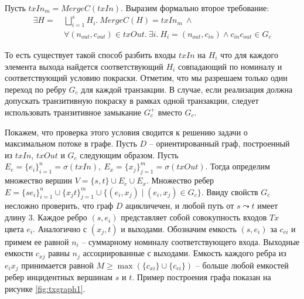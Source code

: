 \documentclass[specification,annotation]{itmo-student-thesis}
\begin{document}
Пусть $txIn_m = MergeC(txIn)$. Выразим формально второе требование:
\begin{align}
  \exists H = \ &\bigsqcup_{i=1}^s{H_i}. \ MergeC(H) = txIn_m \ \wedge \nonumber \\
                &\forall (n_{out},c_{out}) \in txOut . \ \exists i . \ H_i = (n_{out},c_{in}) \wedge c_{in}c_{out} \in G_c \label{eq:1}
\end{align}

То есть существует такой способ разбить входы $txIn$ на $H_i$ что для
каждого элемента выхода найдется соответствующий $H_i$ совпадающий по
номиналу и соответствующий условию покраски. Отметим, что мы разрешаем
только один переход по ребру $G_c$ для каждой транзакции. В случае,
если реализация должна допускать транзитивную покраску в рамках одной
транзакции, следует использовать транзитивное замыкание $G_c^{+}$
вместо $G_c$.

Покажем, что проверка этого условия сводится к решению задачи о
максимальном потоке в графе. Пусть $D$ -- ориентированный граф,
построенный из $txIn$, $txOut$ и $G_c$ следующим образом. Пусть $E_e =
\{e_i\}_{i=1}^n = \sigma(txIn),\ E_x = \{x_j\}_{j=1}^m =
\sigma(txOut)$. Тогда определим множество вершин $V = \{s, t\} \cup
E_e \cup E_x$. Множество ребер $E = \{se_i\}_{i=1}^n \cup
\{x_jt\}_{j=1}^m \cup \{(e_i,x_j) \mid (e_i,x_j) \in G_c\}$. Ввиду
свойств $G_c$ несложно проверить, что граф $D$ ацикличечен, и любой
путь от $s \leadsto t$ имеет длину $3$. Каждое ребро $(s,e_i)$
представляет собой совокупность входов $Tx$ цвета $e_i$. Аналогично с
$(x_j,t)$ и выходами. Обозначим емкость $(s,e_i)$ за $c_{ei}$ и примем
ее равной $n_i$ -- суммарному номиналу соответствующего
входа. Выходные емкости $c_{xj}$ равны $n_j$ ассоциированные с
выходами. Емкость каждого ребра из $e_ix_j$ принимается равной $M \geq
\max{(\{c_{xi}\} \cup \{c_{ei}\})}$ -- больше любой емкостей ребер
инцидентных вершинам $s$ и $t$. Пример построения графа показан на
рисунке \ref{fig:txgraph1}.
\end{document}
